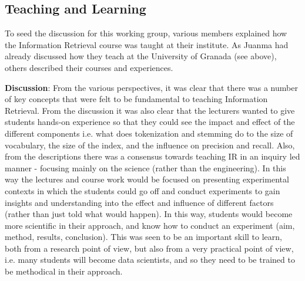 \subsection{Teaching and Learning}
\label{sec:teaching}

To seed the discussion for this working group, various members explained how the Information Retrieval course was taught at their institute. As Juanma had already discussed how they teach at the University of Granada (see above), others described their courses and experiences. 





\noindent
{\bf Discussion}:  From the various perspectives, it was clear that there was a number of key concepts that were felt to be fundamental to teaching Information Retrieval. From the discussion it was also clear that the lecturers wanted to give students hands-on experience so that they could see the impact and effect of the different components i.e. what does tokenization and stemming do to the size of vocabulary, the size of the index, and the influence on precision and recall. Also, from the descriptions there was a consensus towards teaching IR in an inquiry led manner - focusing mainly on the science (rather than the engineering). In this way the lectures and course work would be focused on presenting experimental contexts in which the students could go off and conduct experiments to gain insights and understanding into the effect and influence of different factors (rather than just told what would happen). In this way, students would become more scientific in their approach, and know how to conduct an experiment (aim, method, results, conclusion). This was seen to be an important skill to learn, both from a research point of view, but also from a very practical point of view, i.e. many students will become data scientists, and so they need to be trained to be methodical in their approach.

